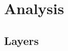 \chapter{Analysis}
\label{ch:analysis}


\newcommand{\EAA}{Patterns of Enterprise Application Architecture}

%
%
%
%
%
%
%
%

\section{Layers}

